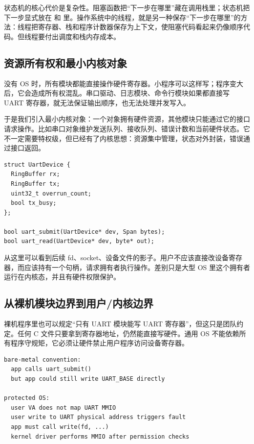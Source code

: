 状态机的核心代价是复杂性。阻塞函数把“下一步在哪里”藏在调用栈里；状态机把下一步显式放在  和  里。操作系统中的线程，就是另一种保存“下一步在哪里”的方法：线程把寄存器、栈和程序计数器保存为上下文，使阻塞代码看起来仍像顺序代码。但线程要付出调度和栈内存成本。

\subsection{资源所有权和最小内核对象}

没有 OS 时，所有模块都能直接操作硬件寄存器。小程序可以这样写；程序变大后，它会造成所有权混乱。串口驱动、日志模块、命令行模块如果都直接写 UART 寄存器，就无法保证输出顺序，也无法处理并发写入。

于是我们引入最小内核对象：一个对象拥有硬件资源，其他模块只能通过它的接口请求操作。比如串口对象维护发送队列、接收队列、错误计数和当前硬件状态。它不一定需要特权级，但已经有了内核思想：资源集中管理，状态对外封装，错误通过接口返回。

\begin{lstlisting}
struct UartDevice {
  RingBuffer rx;
  RingBuffer tx;
  uint32_t overrun_count;
  bool tx_busy;
};

bool uart_submit(UartDevice* dev, Span bytes);
bool uart_read(UartDevice* dev, byte* out);
\end{lstlisting}

从这里可以看到后续 fd、socket、设备文件的影子。用户不应该直接改设备寄存器，而应该持有一个句柄，请求拥有者执行操作。差别只是大型 OS 里这个拥有者运行在内核态，并且有硬件权限保护。

\subsection{从裸机模块边界到用户/内核边界}

裸机程序里也可以规定“只有 UART 模块能写 UART 寄存器”，但这只是团队约定。任何 C 文件只要拿到寄存器地址，仍然能直接写硬件。通用 OS 不能依赖所有程序守规矩，它必须让硬件禁止用户程序访问设备寄存器。

\begin{lstlisting}
bare-metal convention:
  app calls uart_submit()
  but app could still write UART_BASE directly

protected OS:
  user VA does not map UART MMIO
  user write to UART physical address triggers fault
  app must call write(fd, ...)
  kernel driver performs MMIO after permission checks
\end{lstlisting}

